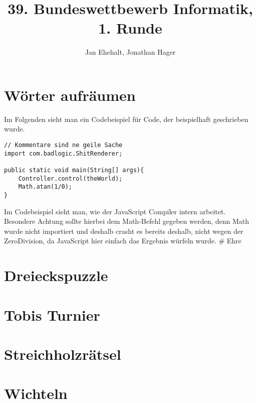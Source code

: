 \documentclass[a4paper, 12pt]{scrartcl}
\title{39. Bundeswettbewerb Informatik, 1. Runde}
\author{Jan Ehehalt, Jonathan Hager}
\date{}
\begin{document}
\maketitle
\thispagestyle{empty}
\newpage
\tableofcontents
\thispagestyle{empty}
\newpage

\section{Wörter aufräumen}

Im Folgenden sieht man ein Codebeispiel für Code, der beispielhaft geschrieben wurde.

\begin{lstlisting}
// Kommentare sind ne geile Sache
import com.badlogic.ShitRenderer;

public static void main(String[] args){
    Controller.control(theWorld);
    Math.atan(1/0);
}
\end{lstlisting}

Im Codebeispiel sieht man, wie der JavaScript Compiler intern arbeitet. Besondere Achtung sollte hierbei dem Math-Befehl gegeben werden, denn Math wurde nicht importiert und deshalb crasht es bereits deshalb, nicht wegen der ZeroDivision, da JavaScript hier einfach das Ergebnis würfeln wurde. \# Ehre

\section{Dreieckspuzzle}
\section{Tobis Turnier}
\section{Streichholzrätsel}
\section{Wichteln}

\end{document}
